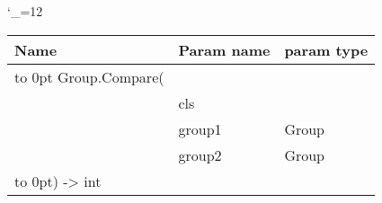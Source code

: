\begingroup \catcode`\_=12 \tt
\begin{tabular}{lll}
\toprule
\textrm{Name}&\textrm{Param name}&\textrm{param type}\\
\midrule
\hbox to 0pt {Group.Compare(\hss}\\
& cls\\
& group1 & Group\\
& group2 & Group\\
\hbox to 0pt{) -> int\hss}\\
\bottomrule
\end{tabular}
\endgroup
